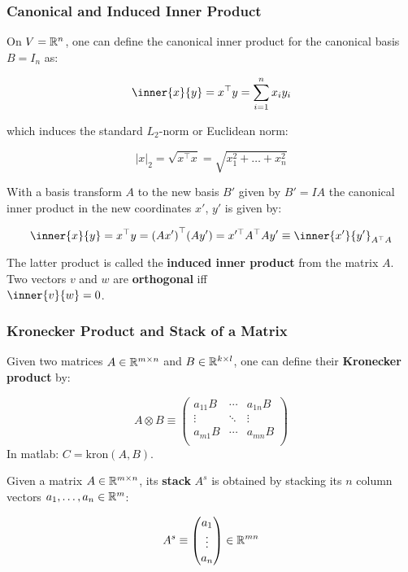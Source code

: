 \subsubsection{Canonical and Induced Inner Product}%
\label{ssub:canonical_and_induced_inner_product}

On $V = \mathbb{R}^n$, one can define the canonical inner product for
the canonical basis $B = I_n$ as:

\[\inner{x}{y} = x^{\top} y = \sum_{i=1}^n x_i y_i\]

which induces the standard $L_2$-norm or Euclidean norm:

\[|x|_2 = \sqrt{x^{\top}x} = \sqrt{x_1^2 + \hdots + x_n^2}\]

With a basis transform $A$ to the new basis $B'$ given by
$B' = IA$ the canonical inner product in the new coordinates
$x'$, $y'$ is given by:

\[\inner{x}{y} = x^{\top} y = {(Ax')}^{\top} (Ay')
= x'^{\top} A^{\top} Ay' \equiv \inner{x'}{y'}_{A^{\top} A}\]

The latter product is called the \textbf{induced inner product}
from the matrix $A$.\\

Two vectors $v$ and $w$ are \textbf{orthogonal} iff\\
$\inner{v}{w} = 0$.


\subsubsection{Kronecker Product and Stack of a Matrix}%
\label{ssub:kronecker_product_and_stack_of_a_matrix}

Given two matrices $A \in \mathbb{R}^{m\times n}$ and $B \in \mathbb{R}^{k \times l}$,
one can define their \textbf{Kronecker product} by:

\[A \otimes B \equiv
	\begin{pmatrix}
		a_{11}B & \cdots & a_{1n}B \\
		\vdots & \ddots & \vdots \\
		a_{m1}B & \cdots & a_{mn}B \\
	\end{pmatrix}
\]
In matlab: $C = \mathrm{kron}(A,B)$.

Given a matrix $A \in \mathbb{R}^{m \times n}$, its \textbf{stack} $A^s$
is obtained by stacking its $n$ column vectors $a_1, \ldots, a_n \in \mathbb{R}^m$:

\[A^s \equiv
	\begin{pmatrix}
		a_1 \\
		\vdots \\
		a_n \\
	\end{pmatrix}
\in \mathbb{R}^{mn}\]

